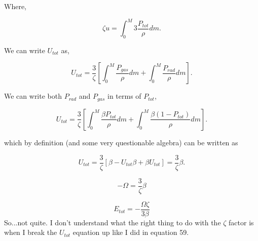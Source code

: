 \documentclass[12pt]{article}
\begin{document}
\noindent Where,

\begin{equation}
\zeta u = \int_0^M 3 \frac{P_{tot}}{\rho} dm.
\end{equation}

\noindent We can write $U_{tot}$ as, 

\begin{equation}
U_{tot} = \frac{3}{\zeta} \left  [ \int_0^M  \frac{P_{gas}}{\rho}dm  + \int_0^M  \frac{P_{rad}}{\rho}dm \right] .
\end{equation}

\noindent We can write both $P_{rad}$ and $P_{gas}$ in terms of $P_{tot}$,

\begin{equation}
U_{tot} = \frac{3}{\zeta} \left  [ \int_0^M  \frac{\beta P_{tot}}{\rho}dm  + \int_0^M  \frac{\beta \left( 1 - P_{tot} \right)}{ \rho}dm \right] .
\end{equation}

\noindent which by definition (and some very questionable algebra) can be written as 

\begin{equation}
U_{tot} = \frac{3}{\zeta} \left[ \beta - U_{tot}\beta + \beta U_{tot}\right] = \frac{3}{\zeta}\beta.
\end{equation}


\begin{equation}
- \Omega =  \frac{3}{\zeta}\beta
\end{equation}

\begin{equation}
E_{tot} = -\frac{\Omega \zeta }{3\beta} 
\end{equation}
\noindent So...not quite. I don't understand what the right thing to do with the $\zeta$ factor is when I break the $U_{tot}$ equation up like I did in equation 59.
\end{document}
